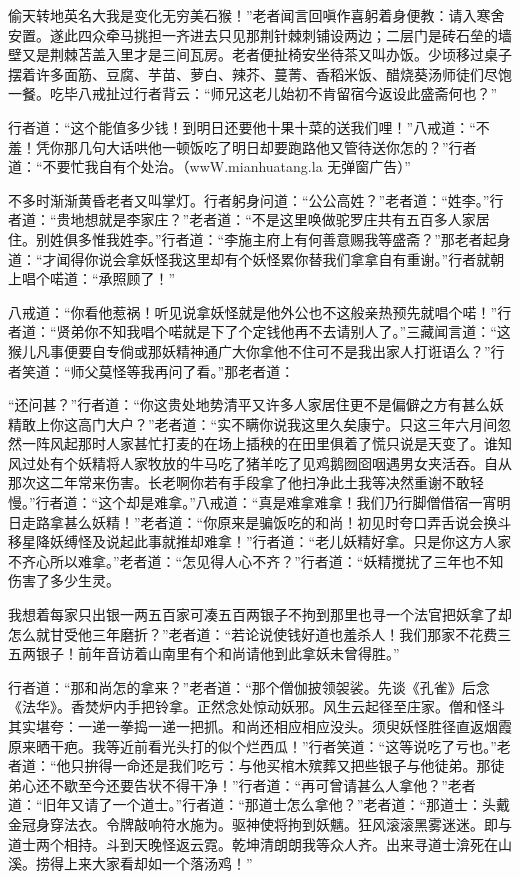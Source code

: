 \documentclass[12pt,UTF8]{ctexbook}
\begin{document}
偷天转地英名大我是变化无穷美石猴！”老者闻言回嗔作喜躬着身便教：请入寒舍安置。遂此四众牵马挑担一齐进去只见那荆针棘刺铺设两边；二层门是砖石垒的墙壁又是荆棘苫盖入里才是三间瓦房。老者便扯椅安坐待茶又叫办饭。少顷移过桌子摆着许多面筋、豆腐、芋苗、萝白、辣芥、蔓菁、香稻米饭、醋烧葵汤师徒们尽饱一餐。吃毕八戒扯过行者背云：“师兄这老儿始初不肯留宿今返设此盛斋何也？”

行者道：“这个能值多少钱！到明日还要他十果十菜的送我们哩！”八戒道：“不羞！凭你那几句大话哄他一顿饭吃了明日却要跑路他又管待送你怎的？”行者道：“不要忙我自有个处治。（wwW.mianhuatang.la 无弹窗广告）”

不多时渐渐黄昏老者又叫掌灯。行者躬身问道：“公公高姓？”老者道：“姓李。”行者道：“贵地想就是李家庄？”老者道：“不是这里唤做驼罗庄共有五百多人家居住。别姓俱多惟我姓李。”行者道：“李施主府上有何善意赐我等盛斋？”那老者起身道：“才闻得你说会拿妖怪我这里却有个妖怪累你替我们拿拿自有重谢。”行者就朝上唱个喏道：“承照顾了！”

八戒道：“你看他惹祸！听见说拿妖怪就是他外公也不这般亲热预先就唱个喏！”行者道：“贤弟你不知我唱个喏就是下了个定钱他再不去请别人了。”三藏闻言道：“这猴儿凡事便要自专倘或那妖精神通广大你拿他不住可不是我出家人打诳语么？”行者笑道：“师父莫怪等我再问了看。”那老者道：

“还问甚？”行者道：“你这贵处地势清平又许多人家居住更不是偏僻之方有甚么妖精敢上你这高门大户？”老者道：“实不瞒你说我这里久矣康宁。只这三年六月间忽然一阵风起那时人家甚忙打麦的在场上插秧的在田里俱着了慌只说是天变了。谁知风过处有个妖精将人家牧放的牛马吃了猪羊吃了见鸡鹅囫囵咽遇男女夹活吞。自从那次这二年常来伤害。长老啊你若有手段拿了他扫净此土我等决然重谢不敢轻慢。”行者道：“这个却是难拿。”八戒道：“真是难拿难拿！我们乃行脚僧借宿一宵明日走路拿甚么妖精！”老者道：“你原来是骗饭吃的和尚！初见时夸口弄舌说会换斗移星降妖缚怪及说起此事就推却难拿！”行者道：“老儿妖精好拿。只是你这方人家不齐心所以难拿。”老者道：“怎见得人心不齐？”行者道：“妖精搅扰了三年也不知伤害了多少生灵。

我想着每家只出银一两五百家可凑五百两银子不拘到那里也寻一个法官把妖拿了却怎么就甘受他三年磨折？”老者道：“若论说使钱好道也羞杀人！我们那家不花费三五两银子！前年音访着山南里有个和尚请他到此拿妖未曾得胜。”

行者道：“那和尚怎的拿来？”老者道：“那个僧伽披领袈裟。先谈《孔雀》后念《法华》。香焚炉内手把铃拿。正然念处惊动妖邪。风生云起径至庄家。僧和怪斗其实堪夸：一递一拳捣一递一把抓。和尚还相应相应没头。须臾妖怪胜径直返烟霞原来晒干疤。我等近前看光头打的似个烂西瓜！”行者笑道：“这等说吃了亏也。”老者道：“他只拚得一命还是我们吃亏：与他买棺木殡葬又把些银子与他徒弟。那徒弟心还不歇至今还要告状不得干净！”行者道：“再可曾请甚么人拿他？”老者道：“旧年又请了一个道士。”行者道：“那道士怎么拿他？”老者道：“那道士：头戴金冠身穿法衣。令牌敲响符水施为。驱神使将拘到妖魑。狂风滚滚黑雾迷迷。即与道士两个相持。斗到天晚怪返云霓。乾坤清朗朗我等众人齐。出来寻道士渰死在山溪。捞得上来大家看却如一个落汤鸡！”
\end{document}
